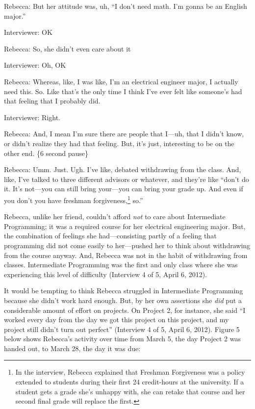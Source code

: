 Rebecca: But her attitude was, uh, ``I don't need math. I'm gonna be an
English major.''

Interviewer: OK

Rebecca: So, she didn't even care about it

Interviewer: Oh, OK

Rebecca: Whereas, like, I was like, I'm an electrical engineer major, I
actually need this. So. Like that's the only time I think I've ever felt
like someone's had that feeling that I probably did.

Interviewer: Right.

Rebecca: And, I mean I'm sure there are people that I---uh, that I
didn't know, or didn't realize they had that feeling. But, it's just,
interesting to be on the other end. \{6 second pause\}

Rebecca: Umm. Just. Ugh. I've like, debated withdrawing from the class.
And, like, I've talked to three different advisors or whatever, and
they're like ``don't do it. It's not---you can still bring your---you
can bring your grade up. And even if you don't you have freshman
forgiveness,\footnote{In the interview, Rebecca explained that Freshman
  Forgiveness was a policy extended to students during their first 24
  credit-hours at the university. If a student gets a grade she's
  unhappy with, she can retake that course and her second final grade
  will replace the first.} so.''

Rebecca, unlike her friend, couldn't afford \emph{not} to care about
Intermediate Programming; it was a required course for her electrical
engineering major. But, the combination of feelings she had---consisting
partly of a feeling that programming did not come easily to her---pushed
her to think about withdrawing from the course anyway. And, Rebecca was
not in the habit of withdrawing from classes. Intermediate Programming
was the first and only class where she was experiencing this level of
difficulty (Interview 4 of 5, April 6, 2012).

It would be tempting to think Rebecca struggled in Intermediate
Programming because she didn't work hard enough. But, by her own
assertions she \emph{did} put a considerable amount of effort on
projects. On Project 2, for instance, she said ``I worked every day from
the day we got this project on this project, and my project still didn't
turn out perfect'' (Interview 4 of 5, April 6, 2012). Figure 5 below
shows Rebecca's activity over time from March 5, the day Project 2 was
handed out, to March 28, the day it was due:

